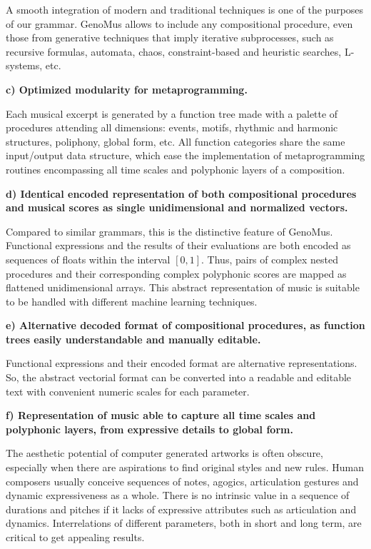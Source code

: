 \documentclass{article}
\begin{document}
A smooth integration of modern and traditional techniques is one of the purposes of our grammar. GenoMus allows to include any compositional procedure, even those from generative techniques that imply iterative subprocesses, such as recursive formulas, automata, chaos, constraint-based and heuristic searches, L-systems, etc. 

\textbf{c) Optimized modularity for metaprogramming.}

Each musical excerpt is generated by a function tree made with a palette of procedures attending all dimensions: events, motifs, rhythmic and harmonic structures, poliphony, global form, etc. All function categories share the same input/output data structure, which ease the implementation of metaprogramming routines encompassing all time scales and polyphonic layers of a composition.

\textbf{d) Identical encoded representation of both compositional procedures and musical scores as single unidimensional and normalized vectors.}

Compared to similar grammars, this is the distinctive feature of GenoMus. Functional expressions and the results of their evaluations are both encoded as sequences of floats within the interval $[0, 1]$. Thus, pairs of complex nested procedures and their corresponding complex polyphonic scores are mapped as flattened unidimensional arrays. This abstract representation of music is suitable to be handled with different machine learning techniques. 

\textbf{e) Alternative decoded format of compositional procedures, as function trees easily understandable and manually editable.}

Functional expressions and their encoded format are alternative representations. So, the abstract vectorial format can be converted into a readable and editable text with convenient numeric scales for each parameter.

\textbf{f) Representation of music able to capture all time scales and polyphonic layers, from expressive details to global form.} 

The aesthetic potential of computer generated artworks is often obscure, especially when there are aspirations to find original styles and new rules. Human composers usually conceive sequences of notes, agogics, articulation gestures and dynamic expressiveness as a whole. There is no intrinsic value in a sequence of durations and pitches if it lacks of expressive attributes such as articulation and dynamics. Interrelations of different parameters, both in short and long term, are critical to get appealing results.
\end{document}
